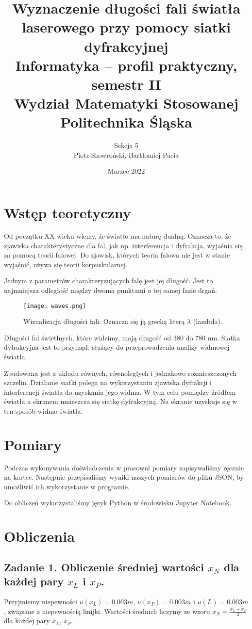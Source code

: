 \documentclass[12pt]{article}
\title{ Wyznaczenie długości fali światła laserowego przy pomocy siatki
dyfrakcyjnej \\
    \large Informatyka – profil praktyczny, semestr II \\
    Wydział Matematyki Stosowanej \\
    Politechnika Śląska \\}
\author{ Sekcja 5 \\
    Piotr Skowroński, Bartłomiej Pacia}
\date{Marzec 2022}
\begin{document}
\maketitle

\section{Wstęp teoretyczny}

Od początku XX wieku wiemy, że światło ma naturę dualną. Oznacza to, że zjawiska
charakterystyczne dla fal, jak np. interferencja i dyfrakcja, wyjaśnia się za
pomocą teorii falowej. Do zjawisk, których teoria falowa nie jest w stanie
wyjaśnić, używa się teorii korpuskularnej.

Jednym z parametrów charakteryzujących falę jest jej długość. Jest to
najmniejsza odległość między dwoma punktami o tej samej fazie drgań.

\begin{figure}[H]
    \centering
    \texttt{[image: waves.png]}
    \caption{Wizualizacja długości fali. Oznacza się ją grecką literą $\lambda$ (lambda). }
\end{figure}
Długości fal świetlnych, które widzimy, mają długość od 380 do 780 nm.
Siatka dyfrakcyjna jest to przyrząd, służący do przeprowadzenia analizy widmowej światła.

Zbudowana jest z układu równych, równoległych i jednakowo rozmieszczonych szczelin.
Działanie siatki polega na wykorzystaniu zjawiska dyfrakcji i interferencji światła do uzyskania jego widma.
W tym celu pomiędzy źródłem światła a ekranem umieszcza się siatkę dyfrakcyjną. Na ekranie uzyskuje się w ten sposób widmo światła.

\section{Pomiary}

Podczas wykonywania doświadczenia w pracowni pomiary zapisywaliśmy ręcznie na
kartce. Następnie przepisaliśmy wyniki naszych pomiarów do pliku JSON, by
umożliwić ich wykorzystanie w programie.

Do obliczeń wykorzystaliśmy język Python w środowisku Jupyter Notebook.

\section{Obliczenia}

\subsection*{Zadanie 1. Obliczenie średniej wartości $x_N$ dla każdej pary $x_L$
    i $x_P$.} Przyjmiemy niepewności $u(x_L)=0.003m$, $u(x_P)=0.003m$ i $u(L)=0.003m$, związane
z niepewnością linijki. Wartości średnich liczymy ze wzoru $x_N = \frac{x_L + x_P}{2}$ dla każdej pary $x_L$, $x_P$.
\end{document}
